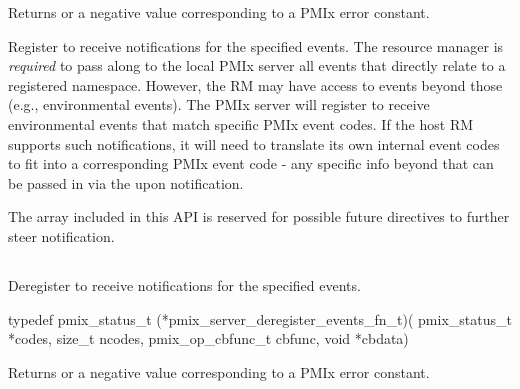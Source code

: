 Returns  or a negative value corresponding to a PMIx error constant.

\descr

Register to receive notifications for the specified events.
The resource manager is \emph{required} to pass along to the local PMIx server all events that directly relate to a registered namespace.
However, the RM may have access to events beyond those (e.g., environmental events).
The PMIx server will register to receive environmental events that match specific PMIx event codes.
If the host RM supports such notifications, it will need to translate its own internal event codes to fit into a corresponding PMIx event code - any specific info beyond that can be passed in via the  upon notification.

The  array included in this API is reserved for possible future directives to further steer notification.



\subsection{}

\summary

Deregister to receive notifications for the specified events.

\format

\cspecificstart
\begin{codepar}
 typedef pmix_status_t (*pmix_server_deregister_events_fn_t)(
                              pmix_status_t *codes, size_t ncodes,
                              pmix_op_cbfunc_t cbfunc, void *cbdata)
\end{codepar}
\cspecificend

\begin{arglist}
\end{arglist}

Returns  or a negative value corresponding to a PMIx error constant.

\descr


